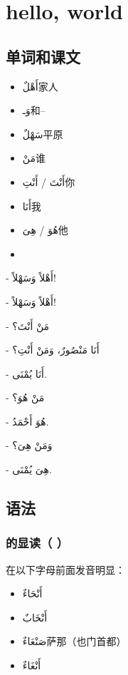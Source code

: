 \chapter{hello, world}

\section{ 单词和课文}

\begin{multicols}{2}
    \begin{itemize}
        \item \ac{أَهْلٌ}{家人}
        \item \ac{وَـ}{和--}
        \item \ac{سَهْلٌ}{平原}
        \item \ac{مَنْ}{谁}
        \item \ac{أَنْتَ / أَنْتِ}{你}
        \item \ac{أَنَا}{我}
        \item \ac{هُوَ / هِىَ}{他}
        \item[]
    \end{itemize}
\end{multicols}


\begin{Arabic}
    - أَهْلاً وَسَهْلاً!

    - أَهْلاً وَسَهْلاً!

    - مَنْ أَنْتَ؟

    - أَنَا مَنْصُورٌ، وَمَنْ أَنْتِ؟

    - أَنَا يُمْنَى.

    - مَنْ هُوَ؟

    - هُوَ أَحْمَدُ.

    - وَمَنْ هِىَ؟

    - هِىَ يُمْنَى.
\end{Arabic}

\section{语法}

\subsection{  的显读（ ）}

 在以下字母前面发音明显：

\begin{multicols}{2}
    \begin{itemize}
        \item \ac{أَنْحَاءٌ}{}
        \item \ac{أَنْخَابٌ}{}
        \item \ac{صَنْعَاءٌ}{萨那（也门首都）}
        \item \ac{أَنْغَاءٌ}{}
    \end{itemize}
\end{multicols}

